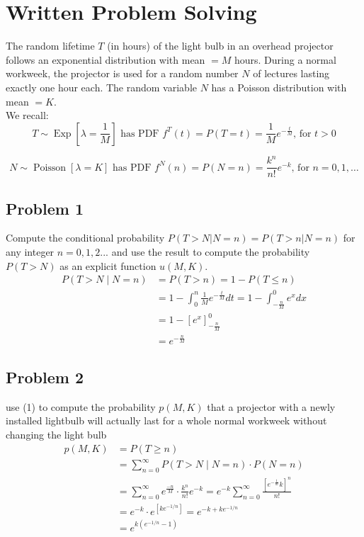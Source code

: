 \documentclass[10pt, letterpaper,]{article}
\begin{document}
			
			
	\section{Written Problem Solving} The random lifetime $T$ (in hours) of the light bulb in an overhead projector follows an exponential distribution with mean $= M$  hours. During a normal workweek, the projector is used for a random number $N$ of lectures lasting exactly one hour each. The random variable $N$ has a Poisson distribution with mean $= K$. \\
	We recall:
	$$ T \sim \operatorname{Exp}\left[\lambda=\frac{1}{M}\right] \text{ has PDF } f^{T}(t)=P(T=t)=\frac{1}{M} e^{-\frac{t}{M}} \text {, for } t>0 $$
	
	$$ N \sim \operatorname{Poisson} \left[ \lambda = K \right] \text{ has PDF } f^{N}(n)=P(N=n)=\frac{k^{n}}{n !} e^{-k} \text{, for } n=0,1, \ldots$$
		\subsection{Problem 1} Compute the conditional probability $P(T > N | N=n) = P(T>n | N=n)$ for any integer $n=0, 1, 2 ...$ and use the result to compute the probability $P(T > N)$ as an explicit function $u(M,K)$.\\
		
	 	$$
	 	\begin{aligned}
	 	P(T>N \mid N=n)&=P(T>n)=1-P(T \leq n)\\
	 	& =1-\int_{0}^{n} \frac{1}{M} e^{-\frac{t}{M}} d t=1-\int_{-\frac{n}{M}}^{0} e^{x} d x \\
	 	& =1-\left[e^{x}\right]_{-\frac{n}{M}}^{0} \\
	 	& \boxed{ =e^{-\frac{n}{M}}} 
	 	\end{aligned}
	 	$$
		\subsection{Problem 2} use (1) to compute the probability $p(M,K)$ that a projector with a newly installed lightbulb will actually last for a whole  normal  workweek without changing the light bulb \\
		$$
		\begin{aligned}
		p(M, K)&=P(T \geq n) \\
		&=\sum_{n=0}^{\infty} P(T>N \mid N=n) \cdot P(N=n) \\
		&=\sum_{n=0}^{\infty} e^{\frac{-n}{M}} \cdot \frac{k^{n}}{n !} e^{-k} =e^{-k} \sum_{n=0}^{\infty} \frac{\left[e^{-\frac{1}{m}} k\right]^{n}}{n !}\\
		&=e^{-k} \cdot e^{\left[k e^{-1 / n}\right]} =e^{-k+k e^{-1 / n}}\\
		&\boxed{=e^{k\left(e^{-1 / n}-1\right)}}
		\end{aligned}
		$$
\end{document}
